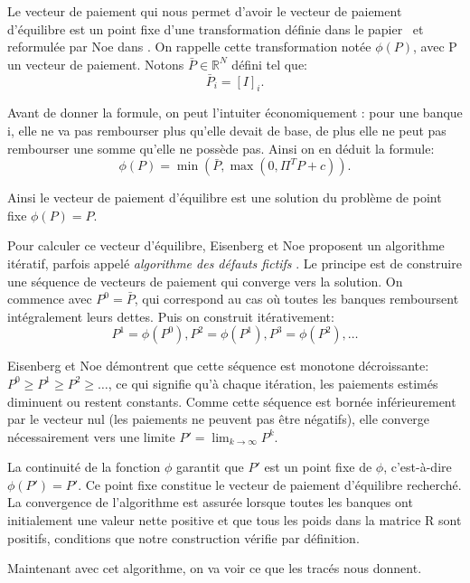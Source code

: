Le vecteur de paiement qui nous permet d'avoir le vecteur de paiement d'équilibre est un point fixe d'une transformation définie dans le papier~\cite{eisenberg2001systemic} et reformulée par Noe dans \cite{peyton2016contagion}. On rappelle cette transformation notée $\phi(P)$, avec P un vecteur de paiement. Notons $\bar{P} \in \mathbb{R}^N$ défini tel que:
$$\bar{P}_i = [I]_i.$$

Avant de donner la formule, on peut l'intuiter économiquement : pour une banque i, elle ne va pas rembourser plus qu'elle devait de base, de plus elle ne peut pas rembourser une somme qu'elle ne possède pas. Ainsi on en déduit la formule:
$$\phi(P) = \min(\bar{P}, \max(0, \Pi^{T}P + c)).$$

Ainsi le vecteur de paiement d'équilibre est une solution du problème de point fixe $\phi(P) = P$.

Pour calculer ce vecteur d'équilibre, Eisenberg et Noe proposent un algorithme itératif, parfois appelé \textit{algorithme des défauts fictifs} \cite{eisenberg2001systemic}.
Le principe est de construire une séquence de vecteurs de paiement qui converge vers la solution.
On commence avec $P^0 = \bar{P}$, qui correspond au cas où toutes les banques remboursent intégralement leurs dettes.
Puis on construit itérativement:
$$P^1 = \phi(P^0), P^2 = \phi(P^1), P^3 = \phi(P^2), \ldots$$

Eisenberg et Noe démontrent que cette séquence est monotone décroissante: $P^0 \geq P^1 \geq P^2 \geq \ldots$, ce qui signifie qu'à chaque itération, les paiements estimés diminuent ou restent constants.
Comme cette séquence est bornée inférieurement par le vecteur nul (les paiements ne peuvent pas être négatifs), elle converge nécessairement vers une limite $P' = \lim_{k \to \infty} P^k$.

La continuité de la fonction $\phi$ garantit que $P'$ est un point fixe de $\phi$, c'est-à-dire $\phi(P') = P'$.
Ce point fixe constitue le vecteur de paiement d'équilibre recherché.
La convergence de l'algorithme est assurée lorsque toutes les banques ont initialement une valeur nette positive et que tous les poids dans la matrice R sont positifs, conditions que notre construction vérifie par définition.

Maintenant avec cet algorithme, on va voir ce que les tracés nous donnent.